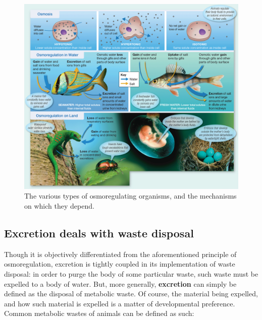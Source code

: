 \documentclass{article}
\begin{document}
\begin{figure}[h]
	\centering
	\includegraphics[width=15cm]{types_of_osmo.png}
	\caption{The various types of osmoregulating organisms, and the mechanisms
	on which they depend.}
\end{figure}

\subsection{Excretion deals with waste disposal}

Though it is objectively differentiated from the aforementioned principle of
osmoregulation, excretion is tightly coupled in its implementation of waste
disposal: in order to purge the body of some particular waste, such waste must
be expelled to a body of water. But, more generally, \textbf{excretion} can
simply be defined as the disposal of metabolic waste. Of course, the material
being expelled, and how such material is expelled is a matter of developmental
preference. Common metabolic wastes of animals can be defined as such:
\end{document}
